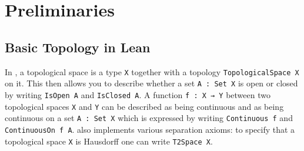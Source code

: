 \section{Preliminaries}


\subsection{Basic Topology in Lean}


In \mathlib, a topological space is a type \lstinline|X| together with a topology \lstinline|TopologicalSpace X| on it.
This then allows you to describe whether a set \lstinline|A : Set X| is open or closed by writing \lstinline|IsOpen A| and \lstinline|IsClosed A|. 
A function \lstinline|f : X → Y| between two topological spaces \lstinline|X| and \lstinline|Y| can be described as being continuous and as being continuous on a set \lstinline|A : Set X| which is expressed by writing \lstinline|Continuous f| and \lstinline|ContinuousOn f A|. 
\mathlib also implements various separation axioms: to specify that a topological space \lstinline|X| is Hausdorff one can write \lstinline|T2Space X|.
